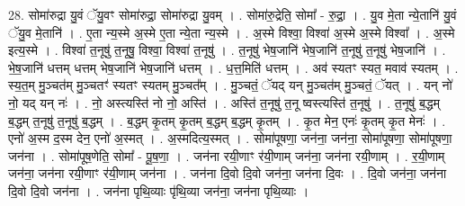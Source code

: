 \documentclass[17pt]{extarticle}
\begin{document}
28. सोमा॑रुद्रा यु॒वं ॅयु॒वꣳ सोमा॑रुद्रा॒ सोमा॑रुद्रा यु॒वम् । . सोमा॑रु॒द्रेति॒ सोमा᳚ - रु॒द्रा॒ । . यु॒व मे॒ता न्ये॒तानि॑ यु॒वं ॅयु॒व मे॒तानि॑ । . ए॒ता न्य॒स्मे अ॒स्मे ए॒ता न्ये॒ता न्य॒स्मे । . अ॒स्मे विश्वा॒ विश्वा॑ अ॒स्मे अ॒स्मे विश्वा᳚ । . अ॒स्मे इत्य॒स्मे । . विश्वा॑ त॒नूषु॑ त॒नूषु॒ विश्वा॒ विश्वा॑ त॒नूषु॑ । . त॒नूषु॑ भेष॒जानि॑ भेष॒जानि॑ त॒नूषु॑ त॒नूषु॑ भेष॒जानि॑ । . भे॒ष॒जानि॑ धत्तम् धत्तम् भेष॒जानि॑ भेष॒जानि॑ धत्तम् । . ध॒त्त॒मिति॑ धत्तम् । . अव॑ स्यतꣳ स्यत॒ मवाव॑ स्यतम् । . स्य॒त॒म् मु॒ञ्चत॑म् मु॒ञ्चतꣳ॑ स्यतꣳ स्यतम् मु॒ञ्चत᳚म् । . मु॒ञ्चतं॒ ॅयद् यन् मु॒ञ्चत॑म् मु॒ञ्चतं॒ ॅयत् । . यन् नो॑ नो॒ यद् यन् नः॑ । . नो॒ अस्त्यस्ति॑ नो नो॒ अस्ति॑ । . अस्ति॑ त॒नूषु॑ त॒नू ष्वस्त्यस्ति॑ त॒नूषु॑ । . त॒नूषु॑ ब॒द्धम् ब॒द्धम् त॒नूषु॑ त॒नूषु॑ ब॒द्धम् । . ब॒द्धम् कृ॒तम् कृ॒तम् ब॒द्धम् ब॒द्धम् कृ॒तम् । . कृ॒त मेन॒ एनः॑ कृ॒तम् कृ॒त मेनः॑ । . एनो॑ अ॒स्म द॒स्म देन॒ एनो॑ अ॒स्मत् । . अ॒स्मदित्य॒स्मत् । . सोमा॑पूषणा॒ जन॑ना॒ जन॑ना॒ सोमा॑पूषणा॒ सोमा॑पूषणा॒ जन॑ना । . सोमा॑पूष॒णेति॒ सोमा᳚ - पू॒ष॒णा॒ । . जन॑ना रयी॒णाꣳ र॑यी॒णाम् जन॑ना॒ जन॑ना रयी॒णाम् । . र॒यी॒णाम् जन॑ना॒ जन॑ना रयी॒णाꣳ र॑यी॒णाम् जन॑ना । . जन॑ना दि॒वो दि॒वो जन॑ना॒ जन॑ना दि॒वः । . दि॒वो जन॑ना॒ जन॑ना दि॒वो दि॒वो जन॑ना । . जन॑ना पृथि॒व्याः पृ॑थि॒व्या जन॑ना॒ जन॑ना पृथि॒व्याः । \newline
\end{document}
